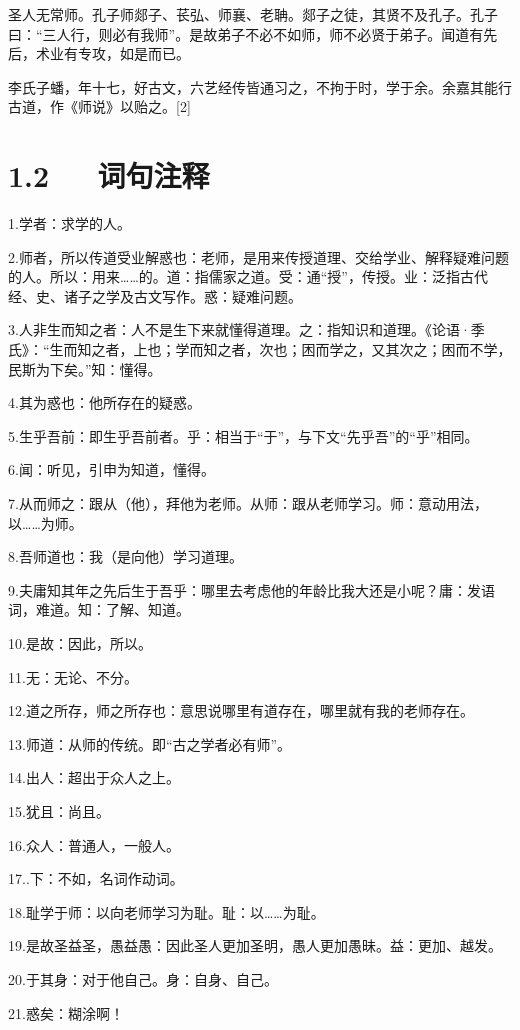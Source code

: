 \documentclass[letterpaper,10pt,english]{sphinxmanual}
\begin{document}
圣人无常师。孔子师郯子、苌弘、师襄、老聃。郯子之徒，其贤不及孔子。孔子曰：“三人行，则必有我师”。是故弟子不必不如师，师不必贤于弟子。闻道有先后，术业有专攻，如是而已。

李氏子蟠，年十七，好古文，六艺经传皆通习之，不拘于时，学于余。余嘉其能行古道，作《师说》以贻之。{[}2{]}


\section{1.2   词句注释}
\label{\detokenize{p01_u6563_u6587/_u97e9_u6108-_u5e08_u8bf4:id4}}
1.学者：求学的人。

2.师者，所以传道受业解惑也：老师，是用来传授道理、交给学业、解释疑难问题的人。所以：用来……的。道：指儒家之道。受：通“授”，传授。业：泛指古代经、史、诸子之学及古文写作。惑：疑难问题。

3.人非生而知之者：人不是生下来就懂得道理。之：指知识和道理。《论语·季氏》：“生而知之者，上也；学而知之者，次也；困而学之，又其次之；困而不学，民斯为下矣。”知：懂得。

4.其为惑也：他所存在的疑惑。

5.生乎吾前：即生乎吾前者。乎：相当于“于”，与下文“先乎吾”的“乎”相同。

6.闻：听见，引申为知道，懂得。

7.从而师之：跟从（他），拜他为老师。从师：跟从老师学习。师：意动用法，以……为师。

8.吾师道也：我（是向他）学习道理。

9.夫庸知其年之先后生于吾乎：哪里去考虑他的年龄比我大还是小呢？庸：发语词，难道。知：了解、知道。

10.是故：因此，所以。

11.无：无论、不分。

12.道之所存，师之所存也：意思说哪里有道存在，哪里就有我的老师存在。

13.师道：从师的传统。即“古之学者必有师”。

14.出人：超出于众人之上。

15.犹且：尚且。

16.众人：普通人，一般人。

17..下：不如，名词作动词。

18.耻学于师：以向老师学习为耻。耻：以……为耻。

19.是故圣益圣，愚益愚：因此圣人更加圣明，愚人更加愚昧。益：更加、越发。

20.于其身：对于他自己。身：自身、自己。

21.惑矣：糊涂啊！
\end{document}
